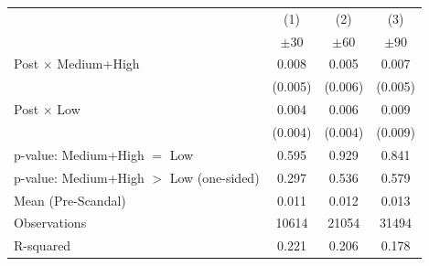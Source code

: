 {
\def\sym#1{\ifmmode^{#1}\else\(^{#1}\)\fi}
\begin{tabular}{l*{3}{c}}
\toprule
            &\multicolumn{1}{c}{(1)}&\multicolumn{1}{c}{(2)}&\multicolumn{1}{c}{(3)}\\
            &\multicolumn{1}{c}{$\pm 30$}&\multicolumn{1}{c}{$\pm 60$}&\multicolumn{1}{c}{$\pm 90$}\\
\midrule
Post $\times$ Medium+High&       0.008         &       0.005         &       0.007         \\
            &     (0.005)         &     (0.006)         &     (0.005)         \\
Post $\times$ Low&       0.004         &       0.006         &       0.009         \\
            &     (0.004)         &     (0.004)         &     (0.009)         \\
\midrule
p-value: Medium+High $=$ Low&       0.595         &       0.929         &       0.841         \\
p-value: Medium+High $>$ Low (one-sided)&       0.297         &       0.536         &       0.579         \\
Mean (Pre-Scandal)&       0.011         &       0.012         &       0.013         \\
Observations&       10614         &       21054         &       31494         \\
R-squared   &       0.221         &       0.206         &       0.178         \\
\bottomrule
\end{tabular}
}
